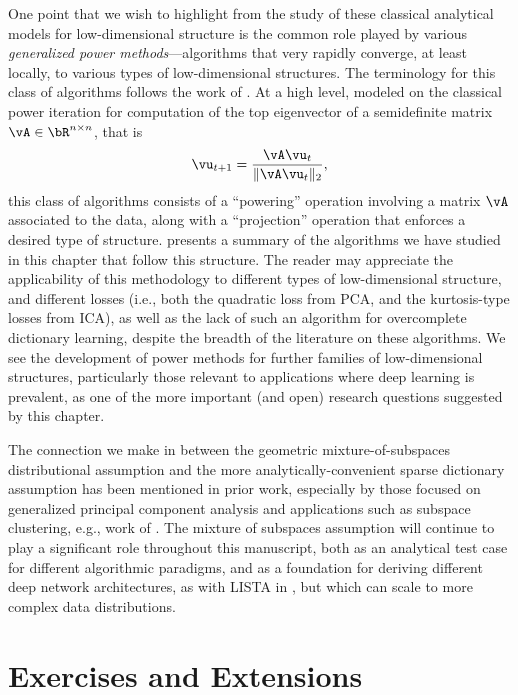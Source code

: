 \documentclass[../../book-main.tex]{subfiles}
\begin{document}
One point that we wish to highlight from the study of these classical
analytical models for low-dimensional structure is the common role played by
various \textit{generalized power methods}---algorithms that very rapidly
converge, at
least locally, to various types of low-dimensional structures. The terminology
for this class of algorithms follows the work of \textcite{JourneeM2010}.
At a high level, modeled on the classical power iteration for computation of the top
eigenvector of a semidefinite matrix $\vA \in \bR^{n \times n}$, that is
\begin{equation}
    \vu_{t+1} = \frac{\vA \vu_{t}}{\norm{\vA \vu_{t}}_2},
\end{equation}
this class of algorithms consists of a ``powering'' operation involving a matrix
$\vA$ associated to the data, along with a ``projection'' operation that
enforces a desired type of structure.  presents
a summary of the algorithms we have studied in this chapter that follow this
structure. The reader may appreciate the applicability of this methodology to
different types of low-dimensional structure, and different losses (i.e., both
the quadratic loss from PCA, and the kurtosis-type losses from ICA), as well as
the lack of such an algorithm for overcomplete dictionary learning, despite the
breadth of the literature on these algorithms. We see the development of power
methods for further families of low-dimensional structures, particularly those
relevant to applications where deep learning is prevalent, as one of the more
important (and open) research questions suggested by this chapter.


The connection we make in  between the
geometric mixture-of-subspaces distributional assumption and the more
analytically-convenient sparse dictionary assumption has been mentioned in prior
work, especially by those focused on generalized principal component analysis
and applications such as subspace clustering, e.g., work of \textcite{GPCA}.
The mixture of subspaces assumption will continue to play a significant role
throughout this manuscript, both as an analytical test case for different
algorithmic paradigms, and as a foundation for deriving different deep network
architectures, as with LISTA in , but which can scale to more
complex data distributions.


\section{Exercises and Extensions}
\end{document}
